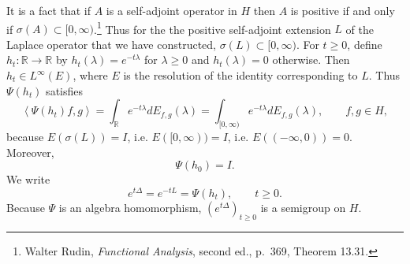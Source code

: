 \documentclass{article}
\newcommand{\inner}[2]{\left\langle #1, #2 \right\rangle}
\theoremstyle{definition}
\begin{document}
It is a fact that if $A$ is a self-adjoint operator in $H$ then $A$ is positive if and only if $\sigma(A) \subset [0,\infty)$.\footnote{Walter
Rudin, {\em Functional Analysis}, second ed., p.~369, Theorem 13.31.}
Thus for the the positive self-adjoint extension $L$ of the Laplace operator that we have constructed,
$\sigma(L) \subset [0,\infty)$. 
For $t \geq 0$,
define $h_t:\mathbb{R} \to \mathbb{R}$ by $h_t(\lambda) = e^{-t\lambda}$ for $\lambda \geq 0$ and $h_t(\lambda)=0$ otherwise. Then
$h_t \in L^\infty(E)$, where $E$ is the resolution of the identity corresponding to $L$. 
Thus $\Psi(h_t)$ satisfies
\[
\inner{\Psi(h_t)f}{g} = \int_{\mathbb{R}} e^{-t\lambda} dE_{f,g}(\lambda)
=\int_{[0,\infty)}  e^{-t\lambda} dE_{f,g}(\lambda), \qquad f,g \in H,
\]
because $E(\sigma(L))=I$, i.e. $E([0,\infty))=I$, i.e. $E((-\infty,0))=0$.
Moreover,
\[
\Psi(h_0)=I.
\]
We write
\[
e^{t \Delta} = e^{-t L} = \Psi(h_t), \qquad t \geq 0.
\]
Because $\Psi$ is an algebra homomorphism, $(e^{t \Delta})_{t \geq 0}$ is a semigroup on $H$.
\end{document}
